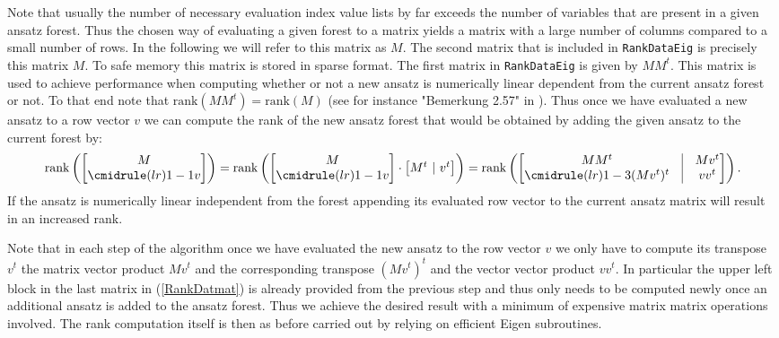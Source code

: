 \documentclass[a4paper,12pt, DIV=14, BCOR=5mm, twoside, headsepline]{scrbook}
\begin{document}
Note that usually the number of necessary evaluation index value lists by far exceeds the number of variables  that are present in a given ansatz forest. Thus the chosen way of evaluating a given forest to a matrix yields a matrix with a large number of columns compared to a small number of rows. In the following we will refer to this matrix as $M$. The second matrix that is included in \texttt{RankDataEig} is precisely this matrix $M$. To safe memory this matrix is stored in sparse format. The first matrix in \texttt{RankDataEig} is given by $M M^t$. This matrix is used to achieve performance when computing whether or not a new ansatz is numerically linear dependent from the current ansatz forest or not. To that end note that $\mathrm{rank}(MM^t) = \mathrm{rank}(M)$ (see for instance "Bemerkung 2.57" in \cite{LAKnab}). Thus once we have evaluated a new ansatz to a row vector $v$ we can compute the rank of the new ansatz forest that would be obtained by adding the given ansatz to the current forest by:
\begin{align}\label{RankDatmat}
    \mathrm{rank}\left (\begin{bmatrix}
        M \\
        \cmidrule(lr){1-1} 
        v
    \end{bmatrix} \right )
    = \mathrm{rank} \left ( \begin{bmatrix}
        M \\
        \cmidrule(lr){1-1}
        v
    \end{bmatrix} \cdot \begin{bmatrix}
        M^t \ \vert \  v^t 
    \end{bmatrix} \right ) = \mathrm{rank} \left (\begin{bmatrix}
        MM^t & \vline & M v^t \\
        \cmidrule(lr){1-3}
        (Mv^t)^t & \vline & vv^t 
    \end{bmatrix}  \right ).
\end{align}
If the ansatz is numerically linear independent from the forest appending its evaluated row vector to the current ansatz matrix will result in an increased rank.

Note that in each step of the algorithm once we have evaluated the new ansatz to the row vector $v$ we only have to compute its transpose $v^t$ the matrix vector product $Mv^t$ and the corresponding transpose $(Mv^t)^t$ and the vector vector product $v v^t$. In particular the upper left block in the last matrix in (\ref{RankDatmat}) is already provided from the previous step and thus only needs to be computed newly once an additional ansatz is added to the ansatz forest. Thus we achieve the desired result with a minimum of expensive matrix matrix operations involved. The rank computation itself is then as before carried out by relying on efficient Eigen subroutines.
\end{document}
